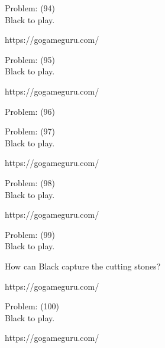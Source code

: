 \documentclass[11pt]{article}
\begin{document}
\begin{minipage}[t]{0.5\textwidth}
  {\centering
  
Problem: (94)\\
Black to play.

https://gogameguru.com/\\
  }
\end{minipage}
\begin{minipage}[t]{0.5\textwidth}
  {\centering
  
Problem: (95)\\
Black to play.

https://gogameguru.com/\\
  }
\end{minipage}
\begin{minipage}[t]{0.5\textwidth}
  {\centering
  
Problem: (96)\\
  }
\end{minipage}
\begin{minipage}[t]{0.5\textwidth}
  {\centering
  
Problem: (97)\\
Black to play.

https://gogameguru.com/\\
  }
\end{minipage}
\begin{minipage}[t]{0.5\textwidth}
  {\centering
  
Problem: (98)\\
Black to play.

https://gogameguru.com/\\
  }
\end{minipage}
\begin{minipage}[t]{0.5\textwidth}
  {\centering
  
Problem: (99)\\
Black to play.

How can Black capture the cutting stones?

https://gogameguru.com/\\
  }
\end{minipage}
\begin{minipage}[t]{0.5\textwidth}
  {\centering
  
Problem: (100)\\
Black to play.

https://gogameguru.com/\\
  }
\end{minipage}
\end{document}
